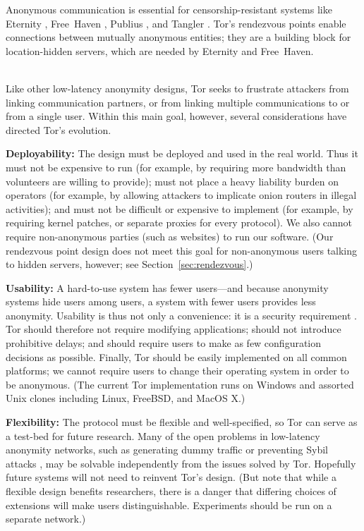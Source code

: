 \documentclass[times,10pt,twocolumn]{article}
\begin{document}
Anonymous communication is essential for censorship-resistant
systems like Eternity \cite{eternity}, Free~Haven \cite{freehaven-berk},
Publius \cite{publius}, and Tangler \cite{tangler}. Tor's rendezvous
points enable connections between mutually anonymous entities; they
are a building block for location-hidden servers, which are needed by
Eternity and Free~Haven.


\label{sec:assumptions}

\\
Like other low-latency anonymity designs, Tor seeks to frustrate
attackers from linking communication partners, or from linking
multiple communications to or from a single user.  Within this
main goal, however, several considerations have directed
Tor's evolution.

\textbf{Deployability:} The design must be deployed and used in the
real world.  Thus it
must not be expensive to run (for example, by requiring more bandwidth
than volunteers are willing to provide); must not place a heavy
liability burden on operators (for example, by allowing attackers to
implicate onion routers in illegal activities); and must not be
difficult or expensive to implement (for example, by requiring kernel
patches, or separate proxies for every protocol).  We also cannot
require non-anonymous parties (such as websites)
to run our software.  (Our rendezvous point design does not meet
this goal for non-anonymous users talking to hidden servers,
however; see Section~\ref{sec:rendezvous}.)

\textbf{Usability:} A hard-to-use system has fewer users---and because
anonymity systems hide users among users, a system with fewer users
provides less anonymity.  Usability is thus not only a convenience:
it is a security requirement \cite{econymics,back01}. Tor should
therefore not
require modifying applications; should not introduce prohibitive delays;
and should require users to make as few configuration decisions
as possible.  Finally, Tor should be easily implemented on all common
platforms; we cannot require users to change their operating system in order
to be anonymous.  (The current Tor implementation runs on Windows and
assorted Unix clones including Linux, FreeBSD, and MacOS X.)

\textbf{Flexibility:} The protocol must be flexible and well-specified,
so Tor can serve as a test-bed for future research.
Many of the open problems in low-latency anonymity
networks, such as generating dummy traffic or preventing Sybil attacks
\cite{sybil}, may be solvable independently from the issues solved by
Tor. Hopefully future systems will not need to reinvent Tor's design.
(But note that while a flexible design benefits researchers,
there is a danger that differing choices of extensions will make users
distinguishable. Experiments should be run on a separate network.)
\end{document}

